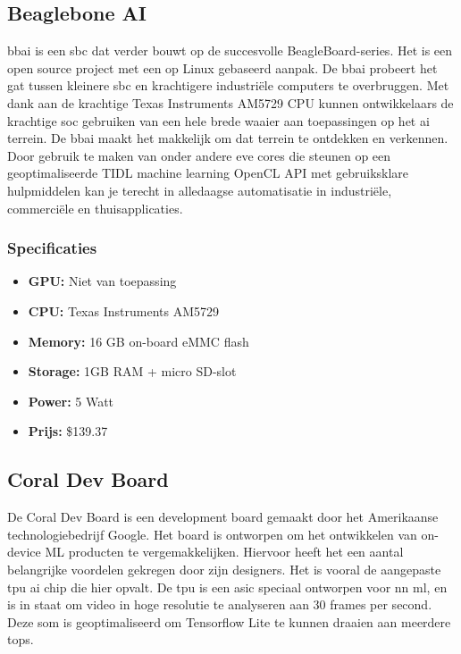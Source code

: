 	\subsection{Beaglebone AI}
	\gls{bbai} is een \gls{sbc} dat verder bouwt op de succesvolle  BeagleBoard-series\citep{bron:bbai}. Het is een open source project met een op Linux gebaseerd aanpak. De \gls{bbai} probeert het gat tussen kleinere \gls{sbc} en krachtigere industri\"ele computers te overbruggen. Met dank aan de krachtige Texas Instruments AM5729 CPU kunnen ontwikkelaars de krachtige \gls{soc} gebruiken van een hele brede waaier aan toepassingen op het \gls{ai} terrein. De \gls{bbai} maakt het makkelijk om dat terrein te ontdekken en verkennen. Door gebruik te maken van onder andere \gls{eve} cores die steunen op een geoptimaliseerde TIDL machine learning OpenCL API met gebruiksklare hulpmiddelen kan je terecht in alledaagse automatisatie in industri\"ele, commerci\"ele en thuisapplicaties.
	
	
		\subsubsection{Specificaties}
		\begin{itemize}
			\item \textbf{GPU:} Niet van toepassing
			\item \textbf{CPU:} Texas Instruments AM5729
			\item \textbf{Memory:} 16 GB on-board eMMC flash
			\item \textbf{Storage:} 1GB RAM + micro SD-slot
			\item \textbf{Power:} 5 Watt
			\item \textbf{Prijs:} \$139.37
		\end{itemize}
	
	\newpage
	\subsection{Coral Dev Board}
	De Coral Dev Board is een development board gemaakt door het Amerikaanse technologiebedrijf Google\citep{bron:coraldev}. Het board is ontworpen om het ontwikkelen van on-device ML producten te vergemakkelijken. Hiervoor heeft het een aantal belangrijke voordelen gekregen door zijn designers. Het is vooral de aangepaste \gls{tpu} \gls{ai} chip die hier opvalt. De \gls{tpu} is een \gls{asic} speciaal ontworpen voor \gls{nn} \gls{ml}, en is in staat om video in hoge resolutie te analyseren aan 30 frames per second. Deze \gls{som} is geoptimaliseerd om Tensorflow Lite te kunnen draaien aan meerdere \gls{tops}.
	
